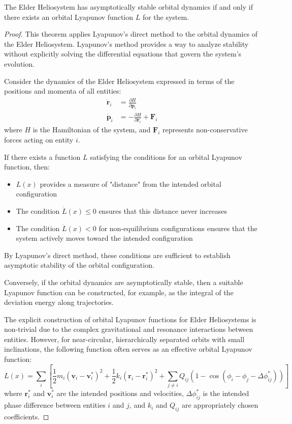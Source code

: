 \begin{theorem}
The Elder Heliosystem has asymptotically stable orbital dynamics if and only if there exists an orbital Lyapunov function $L$ for the system.
\end{theorem}

\begin{proof}
This theorem applies Lyapunov's direct method to the orbital dynamics of the Elder Heliosystem. Lyapunov's method provides a way to analyze stability without explicitly solving the differential equations that govern the system's evolution.

Consider the dynamics of the Elder Heliosystem expressed in terms of the positions and momenta of all entities:
\begin{align}
\dot{\mathbf{r}}_i &= \frac{\partial H}{\partial \mathbf{p}_i} \\
\dot{\mathbf{p}}_i &= -\frac{\partial H}{\partial \mathbf{r}_i} + \mathbf{F}_i
\end{align}
where $H$ is the Hamiltonian of the system, and $\mathbf{F}_i$ represents non-conservative forces acting on entity $i$.

If there exists a function $L$ satisfying the conditions for an orbital Lyapunov function, then:
\begin{itemize}
    \item $L(x)$ provides a measure of "distance" from the intended orbital configuration
    \item The condition $\dot{L}(x) \leq 0$ ensures that this distance never increases
    \item The condition $\dot{L}(x) < 0$ for non-equilibrium configurations ensures that the system actively moves toward the intended configuration
\end{itemize}

By Lyapunov's direct method, these conditions are sufficient to establish asymptotic stability of the orbital configuration.

Conversely, if the orbital dynamics are asymptotically stable, then a suitable Lyapunov function can be constructed, for example, as the integral of the deviation energy along trajectories.

The explicit construction of orbital Lyapunov functions for Elder Heliosystems is non-trivial due to the complex gravitational and resonance interactions between entities. However, for near-circular, hierarchically separated orbits with small inclinations, the following function often serves as an effective orbital Lyapunov function:
\begin{equation}
L(x) = \sum_i \left[ \frac{1}{2}m_i(\mathbf{v}_i - \mathbf{v}_i^*)^2 + \frac{1}{2}k_i(\mathbf{r}_i - \mathbf{r}_i^*)^2 + \sum_{j \neq i} Q_{ij}(1 - \cos(\phi_i - \phi_j - \Delta\phi_{ij}^*)) \right]
\end{equation}
where $\mathbf{r}_i^*$ and $\mathbf{v}_i^*$ are the intended positions and velocities, $\Delta\phi_{ij}^*$ is the intended phase difference between entities $i$ and $j$, and $k_i$ and $Q_{ij}$ are appropriately chosen coefficients.


\end{proof}
